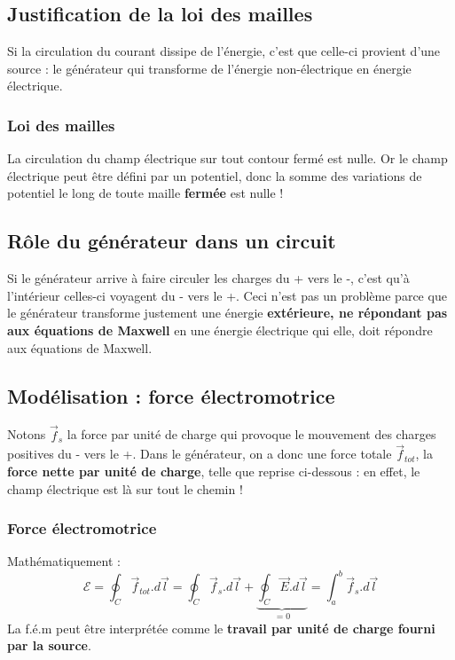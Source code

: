 \documentclass[12pt]{book}
\begin{document}
\subsection{Justification de la loi des mailles}
Si la circulation du courant dissipe de l'énergie, c'est que celle-ci provient d'une source : le générateur qui transforme de l'énergie non-électrique en énergie électrique.
\subsubsection{Loi des mailles}
La circulation du champ électrique sur tout contour fermé est nulle. Or le champ électrique peut être défini par un potentiel, donc la somme des variations de potentiel le long de toute maille \textbf{fermée} est nulle !


\subsection{Rôle du générateur dans un circuit}
Si le générateur arrive à faire circuler les charges du + vers le -, c'est qu'à l'intérieur celles-ci voyagent du - vers le +. Ceci n'est pas un problème parce que le générateur transforme justement une énergie \textbf{extérieure, ne répondant pas aux équations de Maxwell} en une énergie électrique qui elle, doit répondre aux équations de Maxwell.
\subsection{Modélisation : force électromotrice}
Notons $\vec{f}_s$ la force par unité de charge qui provoque le mouvement des charges positives du - vers le +. Dans le générateur, on a donc une force totale $\vec{f}_{tot}$, la \textbf{force nette par unité de charge}, telle que reprise ci-dessous : en effet, le champ électrique est là sur tout le chemin !

\subsubsection{Force électromotrice}
Mathématiquement : $$ \mathcal{E} = \oint_C \vec{f}_{tot} .d \vec{l} = \oint_C \vec{f}_{s} .d \vec{l} + \underbrace{\oint_C \vec{E} .d \vec{l}}_{=0} = \int_a ^b \vec{f}_s .d\vec{l}$$
La f.é.m peut être interprétée comme le \textbf{travail par unité de charge fourni par la source}.
\end{document}
